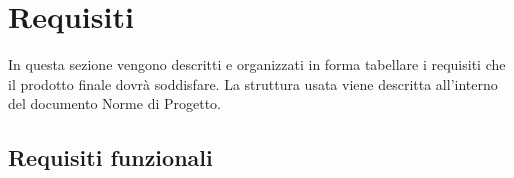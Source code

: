 
\section{Requisiti}
In questa sezione vengono descritti e organizzati in forma tabellare i requisiti che il prodotto finale dovrà soddisfare. La struttura usata viene descritta all'interno del documento Norme di Progetto.


\subsection{Requisiti funzionali}



